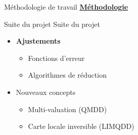 \documentclass[french, 12pt]{beamer}
\begin{document}
\begin{frame}{Méthodologie de travail}
\underline{\textbf{Méthodologie}}
\small{
\begin{center}
\end{center}
}
\end{frame}



\begin{frame}{Suite du projet}
Suite du projet
\begin{itemize}
    \item \textbf{Ajustements}
    \begin{itemize}
        \item Fonctions d'erreur
        \item Algorithmes de réduction
    \end{itemize}
    \item Nouveaux concepts
    \begin{itemize}
        \item Multi-valuation (QMDD)
        \item Carte locale inversible (LIMQDD)
    \end{itemize}
\end{itemize}
\end{frame}
\end{document}
